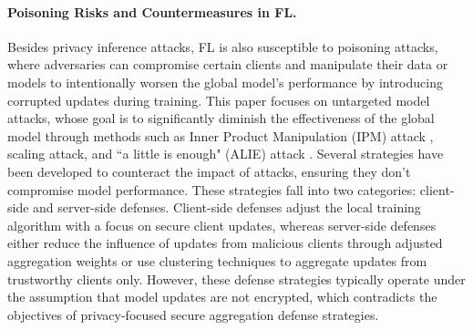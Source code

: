 \paragraph{Poisoning Risks and Countermeasures in FL.}

Besides privacy inference attacks, FL is also susceptible to poisoning attacks, where adversaries can compromise certain clients and manipulate their data or models to intentionally worsen the global model's performance by introducing corrupted updates during training.
This paper focuses on untargeted model attacks, whose goal is to significantly diminish the effectiveness of the global model through methods such as Inner Product Manipulation (IPM) attack \cite{xie2020fall}, scaling attack\cite{bagdasaryan2020backdoor}, and ``a little is enough" (ALIE) attack \cite{baruch2019little}. 
Several strategies have been developed to counteract the impact of attacks, ensuring they don't compromise model performance. 
These strategies fall into two categories: client-side and server-side defenses. Client-side defenses adjust the local training algorithm with a focus on secure client updates\cite{sun2021fl}, whereas server-side defenses \cite{blanchard2017machine,sun2019can,yaldiz2023secure,yin2018byzantine} either reduce the influence of updates from malicious clients through adjusted aggregation weights or use clustering techniques to aggregate updates from trustworthy clients only.
However, these defense strategies typically operate under the assumption that model updates are not encrypted, which contradicts the objectives of privacy-focused secure aggregation defense strategies.




